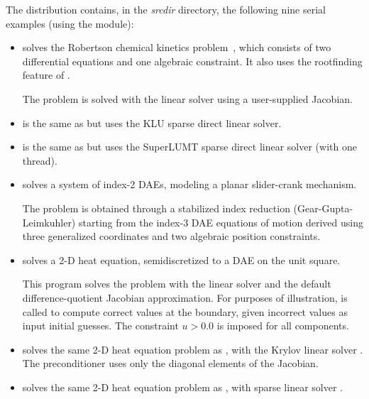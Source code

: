 \vspace{0.2in}\noindent
The {\ida} distribution contains, in the {\em srcdir}
directory, the following nine serial examples (using the {\nvecs} module):
\begin{itemize}

\item {}
  solves the Robertson chemical kinetics problem~\cite{Rob:66}, which consists
  of two differential equations and one algebraic constraint.  It also uses
  the rootfinding feature of {\ida}.

  The problem is solved with the {\sunlinsoldense} linear solver using
  a user-supplied Jacobian.

\item {}
  is the same as  but uses the KLU sparse direct linear solver.

\item {}
  is the same as  but uses the SuperLUMT sparse direct linear
  solver (with one thread).

\item {}
  solves a system of index-2 DAEs, modeling a planar slider-crank mechanism.

  The problem is obtained through a stabilized index reduction (Gear-Gupta-Leimkuhler)
  starting from the index-3 DAE equations of motion derived using three generalized
  coordinates and two algebraic position constraints.

\item {}
  solves a 2-D heat equation, semidiscretized to a DAE on the unit square.

  This program solves the problem with the {\sunlinsolband} linear solver and
  the default difference-quotient Jacobian approximation. For purposes of
  illustration,  is called to compute correct values at the
  boundary, given incorrect values as input initial guesses. The constraint
  $u > 0.0$ is imposed for all components.

\item {}
  solves the same 2-D heat equation problem as , with the Krylov
  linear solver {\sunlinsolspgmr}. The preconditioner uses only the diagonal elements
  of the Jacobian.

\item {}
  solves the same 2-D heat equation problem as , with
  sparse linear solver {\sunlinsolklu}.


\end{itemize}
